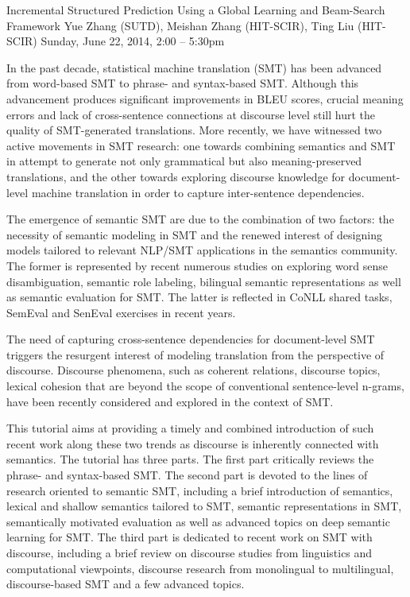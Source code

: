 \begin{tutorial}{Incremental Structured Prediction Using a Global Learning and Beam-Search Framework}
  {Yue Zhang (SUTD), Meishan Zhang (HIT-SCIR), Ting Liu (HIT-SCIR)}
  {Sunday, June 22, 2014, 2:00 -- 5:30pm}
  {\TutLocH}

In the past decade, statistical machine translation (SMT) has been advanced from word-based SMT to phrase- and syntax-based SMT. Although this advancement produces significant improvements in BLEU scores, crucial meaning errors and lack of cross-sentence connections at discourse level still hurt the quality of SMT-generated translations. More recently, we have witnessed two active movements in SMT research: one towards combining semantics and SMT in attempt to generate not only grammatical but also meaning-preserved translations, and the other towards exploring discourse knowledge for document-level machine translation in order to capture inter-sentence dependencies.

The emergence of semantic SMT are due to the combination of two factors: the necessity of semantic modeling in SMT and the renewed interest of designing models tailored to relevant NLP/SMT applications in the semantics community. The former is represented by recent numerous studies on exploring word sense disambiguation, semantic role labeling, bilingual semantic representations as well as semantic evaluation for SMT. The latter is reflected in CoNLL shared tasks, SemEval and SenEval exercises in recent years.

The need of capturing cross-sentence dependencies for document-level SMT triggers the resurgent interest of modeling translation from the perspective of discourse. Discourse phenomena, such as coherent relations, discourse topics, lexical cohesion that are beyond the scope of conventional sentence-level n-grams, have been recently considered and explored in the context of SMT.

This tutorial aims at providing a timely and combined introduction of such recent work along these two trends as discourse is inherently connected with semantics. The tutorial has three parts. The first part critically reviews the phrase- and syntax-based SMT. The second part is devoted to the lines of research oriented to semantic SMT, including a brief introduction of semantics, lexical and shallow semantics tailored to SMT, semantic representations in SMT, semantically motivated evaluation as well as advanced topics on deep semantic learning for SMT. The third part is dedicated to recent work on SMT with discourse, including a brief review on discourse studies from linguistics and computational viewpoints, discourse research from monolingual to multilingual, discourse-based SMT and a few advanced topics.


\end{tutorial}
